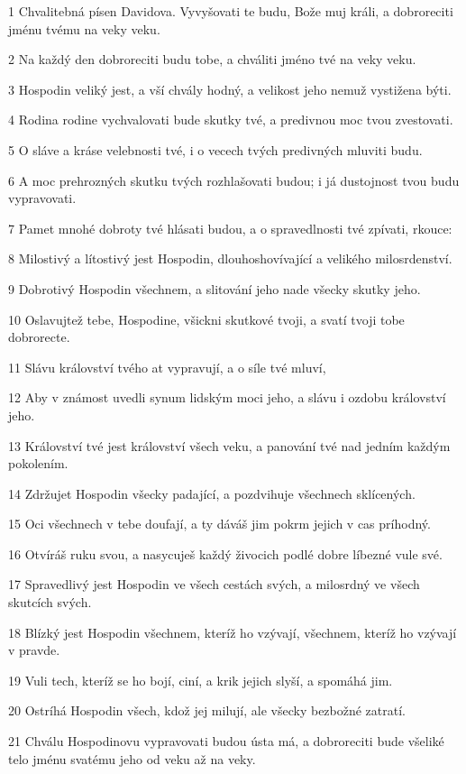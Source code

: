 \par 1 Chvalitebná písen Davidova. Vyvyšovati te budu, Bože muj králi, a dobroreciti jménu tvému na veky veku.
\par 2 Na každý den dobroreciti budu tobe, a chváliti jméno tvé na veky veku.
\par 3 Hospodin veliký jest, a vší chvály hodný, a velikost jeho nemuž vystižena býti.
\par 4 Rodina rodine vychvalovati bude skutky tvé, a predivnou moc tvou zvestovati.
\par 5 O sláve a kráse velebnosti tvé, i o vecech tvých predivných mluviti budu.
\par 6 A moc prehrozných skutku tvých rozhlašovati budou; i já dustojnost tvou budu vypravovati.
\par 7 Pamet mnohé dobroty tvé hlásati budou, a o spravedlnosti tvé zpívati, rkouce:
\par 8 Milostivý a lítostivý jest Hospodin, dlouhoshovívající a velikého milosrdenství.
\par 9 Dobrotivý Hospodin všechnem, a slitování jeho nade všecky skutky jeho.
\par 10 Oslavujtež tebe, Hospodine, všickni skutkové tvoji, a svatí tvoji tobe dobrorecte.
\par 11 Slávu království tvého at vypravují, a o síle tvé mluví,
\par 12 Aby v známost uvedli synum lidským moci jeho, a slávu i ozdobu království jeho.
\par 13 Království tvé jest království všech veku, a panování tvé nad jedním každým pokolením.
\par 14 Zdržujet Hospodin všecky padající, a pozdvihuje všechnech sklícených.
\par 15 Oci všechnech v tebe doufají, a ty dáváš jim pokrm jejich v cas príhodný.
\par 16 Otvíráš ruku svou, a nasycuješ každý živocich podlé dobre líbezné vule své.
\par 17 Spravedlivý jest Hospodin ve všech cestách svých, a milosrdný ve všech skutcích svých.
\par 18 Blízký jest Hospodin všechnem, kteríž ho vzývají, všechnem, kteríž ho vzývají v pravde.
\par 19 Vuli tech, kteríž se ho bojí, ciní, a krik jejich slyší, a spomáhá jim.
\par 20 Ostríhá Hospodin všech, kdož jej milují, ale všecky bezbožné zatratí.
\par 21 Chválu Hospodinovu vypravovati budou ústa má, a dobroreciti bude všeliké telo jménu svatému jeho od veku až na veky.

